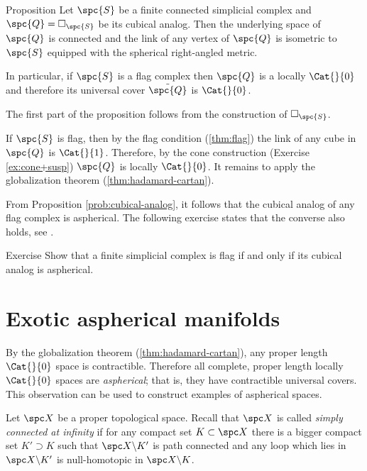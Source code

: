 \begin{thm}{Proposition}\label{prob:cubical-analog}
Let $\spc{S}$ be a finite connected simplicial complex
and $\spc{Q}=\square_{\spc{S}}$ be its cubical analog.
Then the underlying space of $\spc{Q}$ is connected 
and the link of any vertex of $\spc{Q}$
is isometric to  ${\spc{S}}$
equipped with the spherical right-angled metric.

In particular, if $\spc{S}$ is a flag complex 
then $\spc{Q}$ is a locally $\Cat{}{0}$
and therefore its universal cover $\tilde{\spc{Q}}$ is $\Cat{}{0}$.
\end{thm}

The first part of the proposition follows 
from the construction of $\square_{\spc{S}}$.

If ${\spc{S}}$ is flag, 
then by the flag condition (\ref{thm:flag}) 
the link of any cube in $\spc{Q}$ is $\Cat{}{1}$.
Therefore, by the cone construction (Exercise \ref{ex:cone+susp})
$\spc{Q}$
is locally $\Cat{}{0}$.
It remains to apply the globalization theorem 
(\ref{thm:hadamard-cartan}).
\qeds

From Proposition \ref{prob:cubical-analog}, 
it follows that the cubical analog
of any flag complex is aspherical.
The following exercise states that the  converse also holds, see \cite[5.4]{davis-survey}.

\begin{thm}{Exercise}\label{ex:flag-aspherical}
Show that a finite simplicial complex is flag 
if and only if its cubical analog is aspherical.
\end{thm}

\section{Exotic aspherical manifolds}


By the globalization theorem (\ref{thm:hadamard-cartan}),
any proper length $\Cat{}{0}$ space is contractible.
Therefore all complete, proper length locally $\Cat{}{0}$ spaces 
are \emph{aspherical};
that is, they have contractible universal covers.
This observation can be used to construct examples of aspherical spaces. 

Let $\spc X$ be a proper topological space.
Recall that $\spc X$ is called 
\emph{simply connected at infinity} 
if for any compact set $K\subset\spc X$
there is a bigger compact set $K'\supset K$
such that  $\spc X\backslash K'$ is path connected 
and any loop which lies in $\spc X\backslash K'$
is null-homotopic in  $\spc X\backslash K$.

